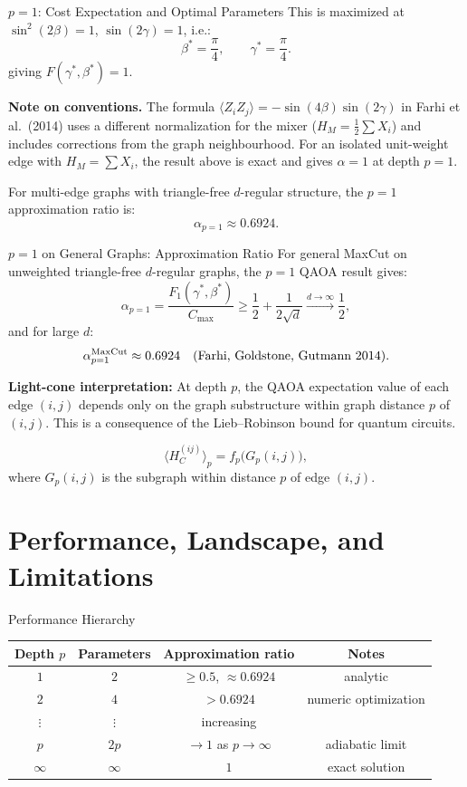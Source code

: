 \documentclass{beamer}
\begin{document}
\begin{frame}
\begin{frame}{$p=1$: Cost Expectation and Optimal Parameters}
This is maximized at $\sin^2(2\beta)=1$, $\sin(2\gamma)=1$, i.e.:
\[
\beta^* = \frac{\pi}{4},\qquad \gamma^* = \frac{\pi}{4}.
\]
giving $F(\gamma^*,\beta^*) = 1$.

\medskip
\textbf{Note on conventions.}  The formula $\langle Z_iZ_j\rangle
= -\sin(4\beta)\sin(2\gamma)$ in Farhi et al.\ (2014) uses a different
normalization for the mixer ($H_M = \tfrac{1}{2}\sum X_i$) and
includes corrections from the graph neighbourhood.
For an isolated unit-weight edge with $H_M = \sum X_i$,
the result above is exact and gives $\alpha=1$ at depth $p=1$.

For multi-edge graphs with triangle-free $d$-regular structure,
the $p=1$ approximation ratio is:
\[
\alpha_{p=1} \approx 0.6924.
\]
\end{frame}


\begin{frame}{$p=1$ on General Graphs: Approximation Ratio}
For general MaxCut on unweighted triangle-free $d$-regular graphs,
the $p=1$ QAOA result gives:
\[
\alpha_{p=1}
= \frac{F_1(\gamma^*,\beta^*)}{C_{\max}}
\ge \frac{1}{2} + \frac{1}{2\sqrt{d}}
\xrightarrow{d\to\infty} \frac{1}{2},
\]
and for large $d$:
\[
\alpha_{p=1}^{\rm MaxCut} \approx 0.6924 \quad
\text{(Farhi, Goldstone, Gutmann 2014).}
\]

\textbf{Light-cone interpretation:}  At depth $p$, the QAOA
expectation value of each edge $(i,j)$ depends only on the graph
substructure within graph distance $p$ of $(i,j)$.
This is a consequence of the Lieb--Robinson bound for quantum circuits.

\[
\langle H_C^{(ij)}\rangle_p = f_p\bigl(G_p(i,j)\bigr),
\]
where $G_p(i,j)$ is the subgraph within distance $p$ of edge $(i,j)$.
\end{frame}


\section{Performance, Landscape, and Limitations}

\begin{frame}{Performance Hierarchy}
\begin{center}
\begin{tabular}{cccc}
\hline
Depth $p$ & Parameters & Approximation ratio & Notes \\
\hline
$1$ & $2$ & $\ge 0.5$, $\approx 0.6924$ & analytic \\
$2$ & $4$ & $> 0.6924$ & numeric optimization \\
$\vdots$ & $\vdots$ & increasing & \\
$p$ & $2p$ & $\to 1$ as $p\to\infty$ & adiabatic limit \\
$\infty$ & $\infty$ & $1$ & exact solution \\
\hline
\end{tabular}
\end{center}


\end{frame}
\end{frame}
\end{document}
